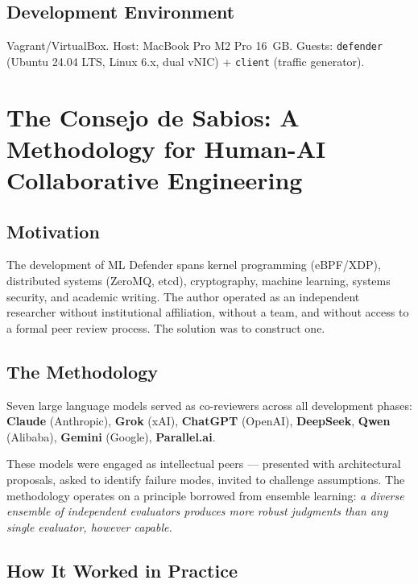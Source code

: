 \documentclass[11pt,a4paper]{article}
\begin{document}
\subsection{Development Environment}

Vagrant/VirtualBox. Host: MacBook Pro M2 Pro 16~GB. Guests: \texttt{defender} (Ubuntu 24.04
LTS, Linux 6.x, dual vNIC) + \texttt{client} (traffic generator).

\section{The Consejo de Sabios: A Methodology for Human-AI Collaborative Engineering}
\label{sec:consejo}

\subsection{Motivation}

The development of ML Defender spans kernel programming (eBPF/XDP), distributed systems
(ZeroMQ, etcd), cryptography, machine learning, systems security, and academic writing. The
author operated as an independent researcher without institutional affiliation, without a
team, and without access to a formal peer review process. The solution was to construct one.

\subsection{The Methodology}

Seven large language models served as co-reviewers across all development phases:
\textbf{Claude} (Anthropic), \textbf{Grok} (xAI), \textbf{ChatGPT} (OpenAI),
\textbf{DeepSeek}, \textbf{Qwen} (Alibaba), \textbf{Gemini} (Google), \textbf{Parallel.ai}.

These models were engaged as intellectual peers --- presented with architectural proposals,
asked to identify failure modes, invited to challenge assumptions. The methodology operates
on a principle borrowed from ensemble learning: \emph{a diverse ensemble of independent
evaluators produces more robust judgments than any single evaluator, however capable.}

\subsection{How It Worked in Practice}
\end{document}
